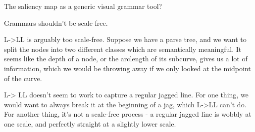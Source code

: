 \documentclass{article}
\begin{document}
\item The saliency map as a generic visual grammar tool?


\item Grammars shouldn't be scale free.

L->LL is arguably too scale-free. Suppose we have a parse tree, and
we want to split the nodes into two different classes which are
semantically meaningful. It seems like the depth of a node, or the
arclength of its subcurve, gives us a lot of information, which we would
be throwing away if we only looked at the midpoint of the curve.

L-> LL doesn't seem to work to capture a regular jagged line. For one
thing, we would want to always break it at the beginning of a jag,
which L->LL can't do. For another thing, it's not a scale-free
process - a regular jagged line is wobbly at one scale, and perfectly
straight at a slightly lower scale. 


\eitem
\end{document}
